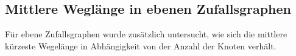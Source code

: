 \documentclass[10pt]{article}
\begin{document}
\subsection{Mittlere Weglänge in ebenen Zufallsgraphen}
Für ebene Zufallsgraphen wurde zusätzlich untersucht, wie sich die mittlere kürzeste Wegelänge in Abhängigkeit von der Anzahl der Knoten verhält. 
\end{document}
